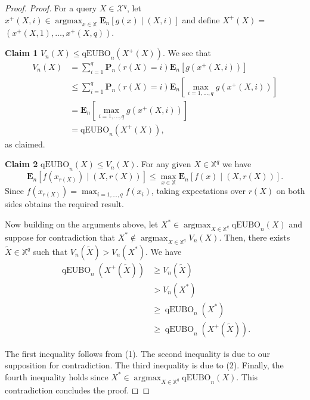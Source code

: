 \documentclass[
  letterpaper,
  DIV=11,
  numbers=noendperiod,
  oneside]{scrreprt}
\theoremstyle{remark}
\begin{document}
\begin{proof}
\emph{Proof.} For a query \(X \in \mathcal{X}^q\), let
\(x^{+}(X, i) \in \operatorname{argmax}_{x \in \mathbb{X}} \mathbf{E}_n[g(x) \mid(X, i)]\)
and define \(X^{+}(X)=\)
\(\left(x^{+}(X, 1), \ldots, x^{+}(X, q)\right)\).

\textbf{Claim 1} \(V_n(X) \leq \mathrm{qEUBO}_n\left(X^{+}(X)\right) .\)
We see that \[\begin{aligned}
V_n(X) & =\sum_{i=1}^q \mathbf{P}_n(r(X)=i) \mathbf{E}_n[g\left(x^{+}(X, i)\right) ] \\
& \leq \sum_{i=1}^q \mathbf{P}_n(r(X)=i) \mathbf{E}_n[\max _{i=1, \ldots, q} g(x^{+}(X, i))] \\
& =\mathbf{E}_n\left[\max _{i=1, \ldots, q} g\left(x^{+}(X, i)\right)\right] \\
& =\mathrm{qEUBO}_n\left(X^{+}(X)\right),
\end{aligned}\] as claimed.

\textbf{Claim 2} \(\mathrm{qEUBO}_n(X) \leq V_n(X) .\) For any given
\(X \in \mathbb{X}^q\) we have
\[\mathbf{E}_n\left[f\left(x_{r(X)}\right) \mid(X, r(X))\right] \leq \max _{x \in \mathbb{X}} \mathbf{E}_n[f(x) \mid(X, r(X))] .\]
Since
\(f\left(x_{r(X)}\right)=\max _{i=1, \ldots, q} f\left(x_i\right)\),
taking expectations over \(r(X)\) on both sides obtains the required
result.

Now building on the arguments above, let
\(X^* \in \operatorname{argmax}_{X \in \mathbb{X}^q} \mathrm{qEUBO}_n(X)\)
and suppose for contradiction that
\(X^* \notin \operatorname{argmax}_{X \in \mathbb{X}^q} V_n(X)\). Then,
there exists \(\widetilde{X} \in \mathbb{X}^q\) such that
\(V_n(\widetilde{X})>V_n\left(X^*\right)\). We have \[\begin{aligned}
\operatorname{qEUBO}_n\left(X^{+}(\tilde{X})\right) & \geq V_n(\tilde{X}) \\
& >V_n\left(X^*\right) \\
& \geq \operatorname{qEUBO}_n\left(X^*\right) \\
& \geq \operatorname{qEUBO}_n\left(X^{+}(\tilde{X})\right) .
\end{aligned}\]

The first inequality follows from (1). The second inequality is due to
our supposition for contradiction. The third inequality is due to (2).
Finally, the fourth inequality holds since
\(X^* \in \operatorname{argmax}_{X \in \mathbb{X}^q} \mathrm{qEUBO}_n(X)\).
This contradiction concludes the proof. ◻
\end{proof}
\end{document}
